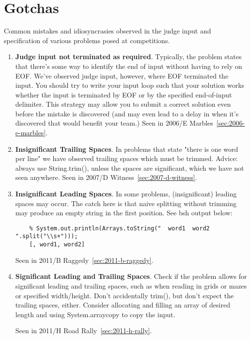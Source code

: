 \chapter{Gotchas}

Common mistakes and idiosyncrasies observed in the judge input and specification of
various problems posed at competitions.

\begin{enumerate}
\item \textbf{Judge input not terminated as required}. Typically, the problem states that
    there's some way to identify the end of input without having to rely on EOF.
    We've observed judge input, however, where EOF terminated the input.
    You should try to write your input loop such that your solution works whether
    the input is terminated by EOF or by the specified end-of-input delimiter.
    This strategy may allow you to submit a correct solution even before the mistake
    is discovered (and may even lead to a delay in when it's discovered that would benefit
    your team.)
    Seen in 2006/E Marbles~\ref{sec:2006-e-marbles}.

\item \textbf{Insignificant Trailing Spaces}.
    In problems that state "there is one word per line" we have observed trailing spaces
    which must be trimmed.   Advice: always use String.trim(), unless the spaces are
    significant, which we have not seen anywhere.
    Seen in 2007/D Witness~\ref{sec:2007-d-witness}.

\item \textbf{Insignificant Leading Spaces}.
    In some problems, (insignificant) leading spaces may occur.  The catch here is that 
    naive splitting without trimming may produce an empty string in the first position.
    See bsh output below:
    \begin{Verbatim}
    % System.out.println(Arrays.toString("  word1  word2  ".split("\\s+")));
    [, word1, word2]
    \end{Verbatim}
 
    Seen in 2011/B Raggedy~\ref{sec:2011-b-raggedy}.

\item \textbf{Significant Leading and Trailing Spaces}.
    Check if the problem allows for significant leading and trailing spaces, such as when
    reading in grids or mazes or specified width/height.  Don't accidentally trim(), but don't
    expect the trailing spaces, either.  Consider allocating and filling an array of desired
    length and using System.arraycopy to copy the input.

    Seen in 2011/H Road Rally~\ref{sec:2011-h-rally}.

\end{enumerate}


